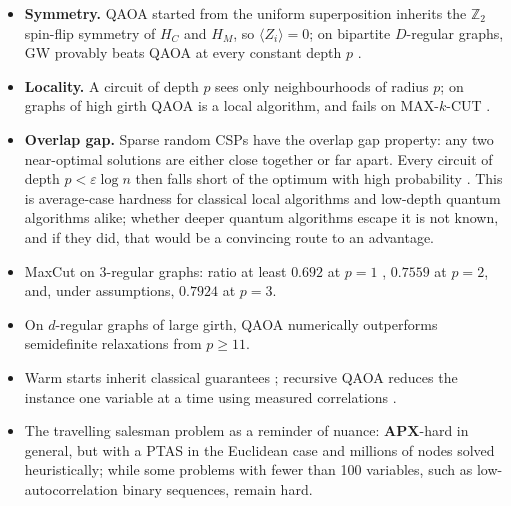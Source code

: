 \documentclass[handoutsbeamer.tex]{subfiles}
\begin{document}
\begin{frame}
\begin{itemize}\setlength\itemsep{0.3em}
    \item \textbf{Symmetry.} QAOA started from the uniform superposition inherits the $\mathbb{Z}_2$ spin-flip symmetry of $H_C$ and $H_M$, so $\langle Z_i\rangle = 0$; on bipartite $D$-regular graphs, GW provably beats QAOA at every constant depth $p$ \citep{Bravyi2020}.
    \item \textbf{Locality.} A circuit of depth $p$ sees only neighbourhoods of radius $p$; on graphs of high girth QAOA is a local algorithm, and fails on MAX-$k$-CUT \citep{BravyiKlieschKoenigTang2022,BarakMarwaha2022}.
    \item \textbf{Overlap gap.} Sparse random CSPs have the overlap gap property: any two near-optimal solutions are either close together or far apart. Every circuit of depth $p < \varepsilon\log n$ then falls short of the optimum with high probability \citep{ChouLoveSandhuShi2021,ChenHuangMarwaha2023}. This is average-case hardness for classical local algorithms and low-depth quantum algorithms alike; whether deeper quantum algorithms escape it is not known, and if they did, that would be a convincing route to an advantage.
\end{itemize}
\end{frame}

\begin{frame}
\begin{itemize}\setlength\itemsep{0.2em}
    \item MaxCut on 3-regular graphs: ratio at least $0.692$ at $p=1$ \citep{farhi2014quantum}, $0.7559$ at $p=2$, and, under assumptions, $0.7924$ at $p=3$.
    \item On $d$-regular graphs of large girth, QAOA numerically outperforms semidefinite relaxations from $p \ge 11$.
    \item Warm starts inherit classical guarantees \citep{egger2021warm}; recursive QAOA reduces the instance one variable at a time using measured correlations \citep{Bravyi2020}.
    \item The travelling salesman problem as a reminder of nuance: $\mathbf{APX}$-hard in general, but with a PTAS in the Euclidean case and millions of nodes solved heuristically; while some problems with fewer than 100 variables, such as low-autocorrelation binary sequences, remain hard.
\end{itemize}
\end{frame}
\end{document}
